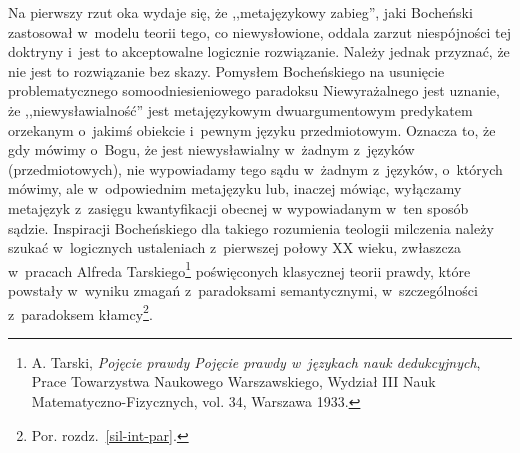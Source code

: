 Na pierwszy rzut oka wydaje się, że ,,metajęzykowy zabieg'', jaki Bocheński zastosował w~modelu teorii tego, co niewysłowione, oddala zarzut niespójności tej doktryny i~jest to akceptowalne logicznie rozwiązanie. Należy jednak przyznać, że nie jest to rozwiązanie bez skazy. Pomysłem Bocheńskiego na usunięcie problematycznego somoodniesieniowego paradoksu Niewyrażalnego jest uznanie, że ,,niewysławialność'' jest metajęzykowym dwuargumentowym predykatem orzekanym o~jakimś obiekcie i~pewnym języku przedmiotowym. Oznacza to, że gdy mówimy o~Bogu, że jest niewysławialny w~żadnym z~języków (przedmiotowych), nie wypowiadamy tego sądu w~żadnym z~języków, o~których mówimy, ale w~odpowiednim metajęzyku lub, inaczej mówiąc, wyłączamy metajęzyk z~zasięgu kwantyfikacji obecnej w wypowiadanym w~ten sposób sądzie. Inspiracji Bocheńskiego dla takiego rozumienia teologii milczenia należy szukać w~logicznych ustaleniach z~pierwszej połowy XX wieku, zwłaszcza w~pracach Alfreda Tarskiego\footnote{A. Tarski, \textit{Pojęcie prawdy Pojęcie prawdy w~językach nauk dedukcyjnych}, Prace Towarzystwa Naukowego Warszawskiego, Wydział III Nauk Matematyczno-Fizycznych, vol. 34, Warszawa 1933.} poświęconych klasycznej teorii prawdy, które powstały w~wyniku zmagań z~paradoksami semantycznymi, w~szczególności z~paradoksem kłamcy\footnote{Por. rozdz.~\ref{sil-int-par}.}.


